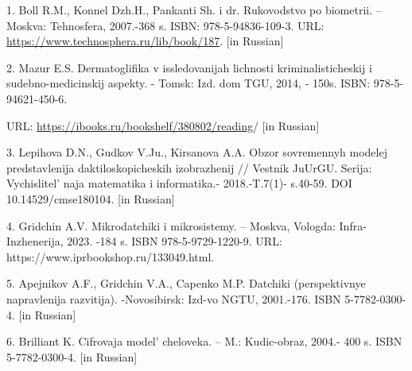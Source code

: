 \begin{references}
1. Boll R.M., Konnel Dzh.H., Pankanti Sh. i dr. Rukovodstvo po
biometrii. -- Moskva: Tehnosfera, 2007.-368 s. ISBN: 978-5-94836-109-3.
URL: \url{https://www.technosphera.ru/lib/book/187}. {[}in Russian{]}

2. Mazur E.S. Dermatoglifika v issledovanijah lichnosti
kriminalisticheskij i sudebno-medicinskij aspekty. - Tomsk: Izd. dom
TGU, 2014, - 150s. ISBN: 978-5-94621-450-6.

URL: \url{https://ibooks.ru/bookshelf/380802/reading}/ {[}in Russian{]}

3. Lepihova D.N., Gudkov V.Ju., Kirsanova A.A. Obzor sovremennyh modelej
predstavlenija daktiloskopi\-cheskih izobrazhenij // Vestnik JuUrGU.
Serija: Vychislitel' naja matematika i informatika.-
2018.-T.7(1)- s.40-59. DOI 10.14529/cmse180104. {[}in Russian{]}

4. Gridchin A.V. Mikrodatchiki i mikrosistemy. -- Moskva, Vologda:
Infra-Inzhenerija, 2023. -184 s. ISBN 978-5-9729-1220-9. URL:
https://www.iprbookshop.ru/133049.html.

5. Apejnikov A.F., Gridchin V.A., Capenko M.P. Datchiki (perspektivnye
napravlenija razvitija). -Novosib\-irsk: Izd-vo NGTU, 2001.-176. ISBN
5-7782-0300-4. {[}in Russian{]}

6. Brilliant K. Cifrovaja model'{} cheloveka. -- M.:
Kudic-obraz, 2004.- 400 s. ISBN 5-7782-0300-4. {[}in Russian{]}
\end{references}

